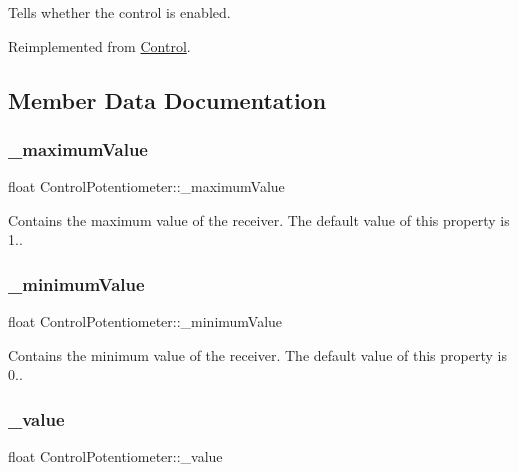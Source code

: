 Tells whether the control is enabled. 

Reimplemented from \hyperlink{classControl_a55339ae920182245d5ec114c33f4b1fd}{Control}.



\subsection{Member Data Documentation}
\mbox{\label{classControlPotentiometer_a0553fb25f4666b1076a3e39133a7d193}} 
\subsubsection{\texorpdfstring{\+\_\+maximum\+Value}{\_maximumValue}}
{\footnotesize\ttfamily float Control\+Potentiometer\+::\+\_\+maximum\+Value\hspace{0.3cm}{\ttfamily [protected]}}

Contains the maximum value of the receiver. The default value of this property is 1.. \mbox{\label{classControlPotentiometer_a38f0851688e8848abc721ecbc3fcc8bf}} 
\subsubsection{\texorpdfstring{\+\_\+minimum\+Value}{\_minimumValue}}
{\footnotesize\ttfamily float Control\+Potentiometer\+::\+\_\+minimum\+Value\hspace{0.3cm}{\ttfamily [protected]}}

Contains the minimum value of the receiver. The default value of this property is 0.. \mbox{\label{classControlPotentiometer_a774e4c02eccc1e070ad8cf2b7e86851c}} 
\subsubsection{\texorpdfstring{\+\_\+value}{\_value}}
{\footnotesize\ttfamily float Control\+Potentiometer\+::\+\_\+value\hspace{0.3cm}{\ttfamily [protected]}}

